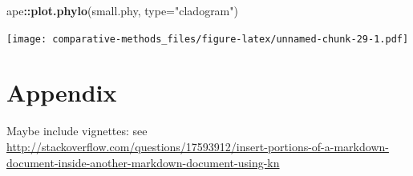 \documentclass[]{article}
\newenvironment{Shaded}{\begin{snugshade}}{\end{snugshade}}
\newcommand{\DataTypeTok}[1]{\textcolor[rgb]{0.13,0.29,0.53}{#1}}
\newcommand{\KeywordTok}[1]{\textcolor[rgb]{0.13,0.29,0.53}{\textbf{#1}}}
\newcommand{\NormalTok}[1]{#1}
\newcommand{\OperatorTok}[1]{\textcolor[rgb]{0.81,0.36,0.00}{\textbf{#1}}}
\newcommand{\StringTok}[1]{\textcolor[rgb]{0.31,0.60,0.02}{#1}}
\theoremstyle{definition}
\theoremstyle{definition}
\theoremstyle{definition}
\theoremstyle{remark}
\begin{document}
\begin{Shaded}
\begin{Highlighting}[]
\NormalTok{ape}\OperatorTok{::}\KeywordTok{plot.phylo}\NormalTok{(small.phy, }\DataTypeTok{type=}\StringTok{"cladogram"}\NormalTok{)}
\end{Highlighting}
\end{Shaded}

\texttt{[image: comparative-methods\_files/figure-latex/unnamed-chunk-29-1.pdf]}

\hypertarget{appendix}{%
\section{Appendix}\label{appendix}}

Maybe include vignettes: see
\url{http://stackoverflow.com/questions/17593912/insert-portions-of-a-markdown-document-inside-another-markdown-document-using-kn}
\end{document}
